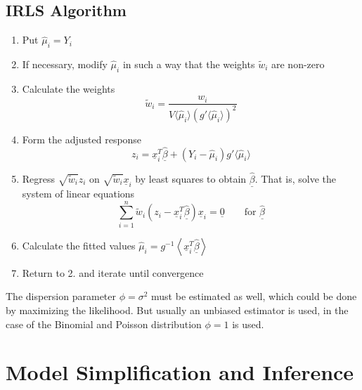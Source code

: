 \documentclass[11pt]{article}
\begin{document}
\subsection{IRLS Algorithm}

\begin{enumerate}
	\item Put $\widehat{\mu}_i = Y_i$
	\item If necessary, modify $\widehat{\mu}_i$ in such a way that the weights $\tilde{w}_i$ are non-zero
	\item Calculate the weights\\
	\begin{equation*}
		\tilde{w}_i = \frac{w_i}{V\langle\widehat{\mu}_i\rangle (g'\langle\widehat{\mu}_i\rangle)^2}
	\end{equation*}
	\item Form the adjusted response\\
	\begin{equation*}
		z_i = \underline{x}_i^T \underline{\widehat{\beta}} + (Y_i - \widehat{\mu}_i)g'\langle\widehat{\mu}_i\rangle
	\end{equation*}
	\item Regress $\sqrt{\tilde{w}_i}z_i$ on $\sqrt{\tilde{w}_i}\underline{x}_i$ by least squares to obtain $\underline{\widehat{\beta}}$. That is, solve the system of linear equations\\
	\begin{equation*}
		\sum_{i=1}^{n}\tilde{w}_i (z_i - \underline{x}_i^T\underline{\widehat{\beta}})\underline{x}_i = \underline{0}\qquad\text{for }\underline{\widehat{\beta}}
	\end{equation*}
	\item Calculate the fitted values $\widehat{\mu}_i = g^{-1}\left\langle \underline{x}_i^T\underline{\widehat{\beta}} \right\rangle$
	\item Return to 2. and iterate until convergence
\end{enumerate}

The dispersion parameter $\phi = \sigma^2$ must be estimated as well, which could be done by maximizing the likelihood. But usually an unbiased estimator is used, in the case of the Binomial and Poisson distribution $\phi = 1$ is used.

\section{Model Simplification and Inference}
\end{document}
